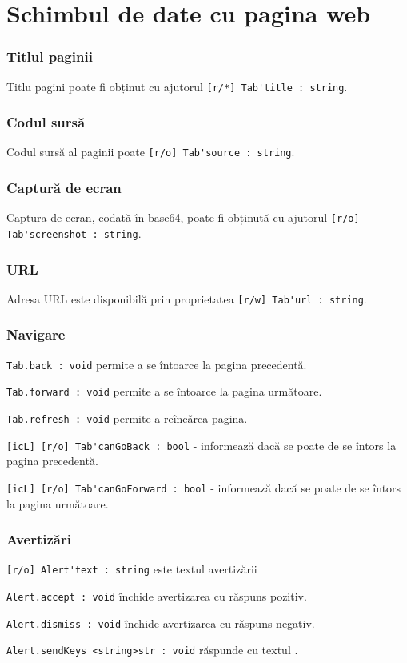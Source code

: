 \section{Schimbul de date cu pagina web}
\label{dataexchange}

\subsubsection{Titlul paginii}

Titlu pagini poate fi obținut cu ajutorul \lstinline|[r/*] Tab'title : string|.

\subsubsection{Codul sursă}

Codul sursă al paginii poate \lstinline|[r/o] Tab'source : string|.

\subsubsection{Captură de ecran}

Captura de ecran, codată în base64, poate fi obținută cu ajutorul \lstinline|[r/o] Tab'screenshot : string|.

\subsubsection{URL}

Adresa URL este disponibilă prin proprietatea \lstinline|[r/w] Tab'url : string|.

\subsubsection{Navigare}

\lstinline|Tab.back : void| permite a se întoarce la pagina precedentă.

\lstinline|Tab.forward : void| permite a se întoarce la pagina următoare.

\lstinline|Tab.refresh : void|  permite a reîncărca pagina.

\lstinline|[icL] [r/o] Tab'canGoBack : bool| - informează dacă se poate de se întors la pagina precedentă.

\lstinline|[icL] [r/o] Tab'canGoForward : bool| - informează dacă se poate de se întors la pagina următoare.


\subsubsection{Avertizări}

\lstinline|[r/o] Alert'text : string| este textul avertizării

\lstinline|Alert.accept : void| închide avertizarea cu răspuns pozitiv.

\lstinline|Alert.dismiss : void| închide avertizarea cu răspuns negativ.

\lstinline|Alert.sendKeys <string>str : void| răspunde cu textul .

